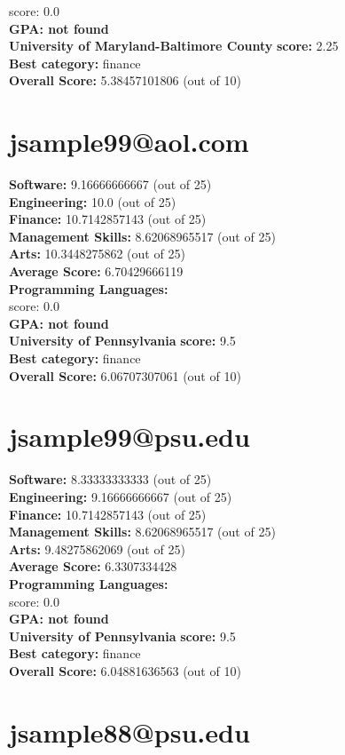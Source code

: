 \documentclass{article}
\begin{document}
score: 0.0\\
\textbf{GPA: not found}\\
\textbf{University of Maryland-Baltimore County} \textbf{score:} 2.25\\
\textbf{Best category: } finance\\
\textbf{Overall Score: }5.38457101806 (out of 10)\section{jsample99@aol.com}
\textbf{Software:} 9.16666666667 (out of 25)\\
\textbf{Engineering: } 10.0 (out of 25)\\
\textbf{Finance:} 10.7142857143 (out of 25)\\
\textbf{Management Skills:} 8.62068965517 (out of 25)\\
\textbf{Arts:} 10.3448275862 (out of 25)\\
\textbf{Average Score: } 6.70429666119\\
\textbf{Programming Languages:} \\
score: 0.0\\
\textbf{GPA: not found}\\
\textbf{University of Pennsylvania} \textbf{score:} 9.5\\
\textbf{Best category: } finance\\
\textbf{Overall Score: }6.06707307061 (out of 10)\section{jsample99@psu.edu}
\textbf{Software:} 8.33333333333 (out of 25)\\
\textbf{Engineering: } 9.16666666667 (out of 25)\\
\textbf{Finance:} 10.7142857143 (out of 25)\\
\textbf{Management Skills:} 8.62068965517 (out of 25)\\
\textbf{Arts:} 9.48275862069 (out of 25)\\
\textbf{Average Score: } 6.3307334428\\
\textbf{Programming Languages:} \\
score: 0.0\\
\textbf{GPA: not found}\\
\textbf{University of Pennsylvania} \textbf{score:} 9.5\\
\textbf{Best category: } finance\\
\textbf{Overall Score: }6.04881636563 (out of 10)\section{jsample88@psu.edu}
\end{document}
